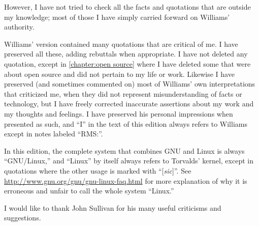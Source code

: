 However, I have not tried to check all the facts and quotations that
are outside my knowledge; most of those I have simply carried forward
on Williams' authority.

Williams' version contained many quotations that are critical of me.  I
have preserved all these, adding rebuttals when appropriate.  I have
not deleted any quotation, except in \autoref{chapter:open source} where I have deleted
some that were about open source and did not pertain to my life or
work.  Likewise I have preserved (and sometimes commented on) most of
Williams' own interpretations that criticized me, when they did not
represent misunderstanding of facts or technology, but I have freely
corrected inaccurate assertions about my work and my thoughts and
feelings.  I have preserved his personal impressions when presented as
such, and ``I'' in the text of this edition always refers to Williams
except in notes labeled ``RMS:''.

In this edition, the complete system that combines GNU and Linux is
always ``GNU/Linux,'' and ``Linux'' by itself always refers to Torvalds'
kernel, except in quotations where the other usage is marked with
``[\textit{sic}]''.  See \url{http://www.gnu.org/gnu/gnu-linux-faq.html} for more
explanation of why it is erroneous and unfair to call the whole system
``Linux.''

I would like to thank John Sullivan for his many useful criticisms and
suggestions.
